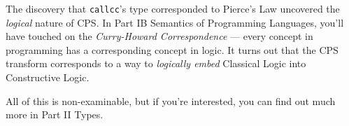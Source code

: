 The discovery that \texttt{callcc}'s type corresponded to Pierce's Law uncovered the \emph{logical} nature of CPS. In {\sffamily Part IB Semantics of Programming Languages}, you'll have touched on the \emph{Curry-Howard Correspondence} --- every concept in programming has a corresponding concept in logic. It turns out that the CPS transform corresponds to a way to \emph{logically embed} Classical Logic into Constructive Logic.

All of this is non-examinable, but if you're interested, you can find out much more in {\sffamily Part II Types}.




